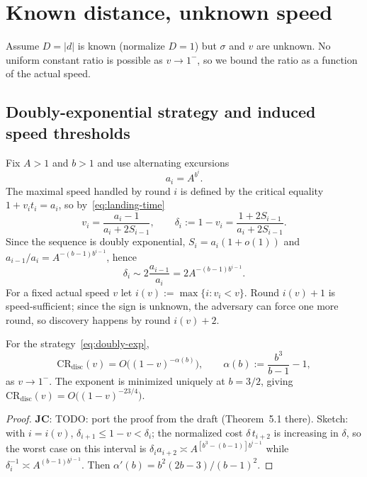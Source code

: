 \documentclass[runningheads,envcountsame,envcountsect]{llncs}
\newcommand\JC[1]{{\color{Maroon} \textbf{JC}: #1}}
\newcommand{\CR}{\mathrm{CR}}
\newcommand{\disc}{\mathrm{disc}}
\begin{document}
\FloatBarrier
\section{Known distance, unknown speed}\label{sec:unknown-speed}

Assume $D = |d|$ is known (normalize $D = 1$) but $\sigma$ and $v$ are unknown. No uniform constant ratio is possible as $v \to 1^-$, so we bound the ratio as a function of the actual speed.

\subsection{Doubly-exponential strategy and induced speed thresholds}

Fix $A > 1$ and $b > 1$ and use alternating excursions
\begin{equation}\label{eq:doubly-exp}
  a_i = A^{b^i} .
\end{equation}
The maximal speed handled by round $i$ is defined by the critical equality $1 + v_i t_i = a_i$, so by~\eqref{eq:landing-time}
\begin{equation}\label{eq:threshold}
  v_i = \frac{a_i - 1}{a_i + 2 S_{i-1}}, \qquad \delta_i := 1 - v_i = \frac{1 + 2 S_{i-1}}{a_i + 2 S_{i-1}} .
\end{equation}
Since the sequence is doubly exponential, $S_i = a_i(1 + o(1))$ and $a_{i-1}/a_i = A^{-(b-1) b^{i-1}}$, hence
\begin{equation}\label{eq:delta-asymp}
  \delta_i \sim 2 \frac{a_{i-1}}{a_i} = 2 A^{-(b-1) b^{i-1}} .
\end{equation}
For a fixed actual speed $v$ let $i(v) := \max\{ i : v_i < v \}$. Round $i(v) + 1$ is speed-sufficient; since the sign is unknown, the adversary can force one more round, so discovery happens by round $i(v) + 2$.

\begin{theorem}\label{thm:disc-unknown}
For the strategy~\eqref{eq:doubly-exp},
\[
  \CR_{\disc}(v) = O\big( (1 - v)^{-\alpha(b)} \big), \qquad \alpha(b) := \frac{b^3}{b - 1} - 1,
\]
as $v \to 1^-$. The exponent is minimized uniquely at $b = 3/2$, giving $\CR_{\disc}(v) = O\big((1-v)^{-23/4}\big)$.
\end{theorem}
\begin{proof}
\JC{TODO: port the proof from the draft (Theorem~5.1 there). Sketch: with $i = i(v)$, $\delta_{i+1} \leq 1 - v < \delta_i$; the normalized cost $\delta\, t_{i+2}$ is increasing in $\delta$, so the worst case on this interval is $\delta_i a_{i+2} \asymp A^{[b^3 - (b-1)] b^{i-1}}$ while $\delta_i^{-1} \asymp A^{(b-1) b^{i-1}}$. Then $\alpha'(b) = b^2 (2b - 3)/(b-1)^2$.}
\end{proof}
\end{document}
